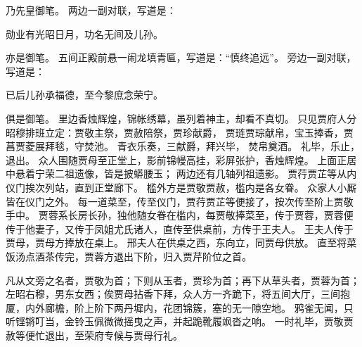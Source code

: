 乃先皇御笔。
两边一副对联，写道是：\par
\hop
勋业有光昭日月，功名无间及儿孙。
\par
\hop
亦是御笔。
五间正殿前悬一闹龙填青匾，写道是：“慎终追远”。
旁边一副对联，写道是：\par
\hop
已后儿孙承福德，至今黎庶念荣宁。
\par
\hop
俱是御笔。
里边香烛辉煌，锦帐绣幕，虽列着神主，却看不真切。
只见贾府人分昭穆排班立定：贾敬主祭，贾赦陪祭，贾珍献爵，
贾琏贾琮献帛，宝玉捧香，贾菖贾菱展拜毯，守焚池。
青衣乐奏，三献爵，拜兴毕，
焚帛奠酒。
礼毕，乐止，退出。
众人围随贾母至正堂上，影前锦幔高挂，彩屏张护，香烛辉煌。
上面正居中悬着宁荣二祖遗像，皆是披蟒腰玉；
两边还有几轴列祖遗影。
贾荇贾芷等从内仪门挨次列站，直到正堂廊下。
槛外方是贾敬贾赦，槛内是各女眷。
众家人小厮皆在仪门之外。
每一道菜至，传至仪门，贾荇贾芷等便接了，按次传至阶上贾敬手中。
贾蓉系长房长孙，独他随女眷在槛内，每贾敬捧菜至，传于贾蓉，贾蓉便传于他妻子，又传于凤姐尤氏诸人，直传至供桌前，方传于王夫人。
王夫人传于贾母，贾母方捧放在桌上。
邢夫人在供桌之西，东向立，同贾母供放。
直至将菜饭汤点酒茶传完，贾蓉方退出下阶，归入贾芹阶位之首。
\par
凡从文旁之名者，贾敬为首；下则从玉者，贾珍为首；再下从草头者，贾蓉为首；左昭右穆，男东女西；俟贾母拈香下拜，众人方一齐跪下，将五间大厅，三间抱厦，内外廊檐，阶上阶下两丹墀内，花团锦簇，塞的无一隙空地。
鸦雀无闻，只听铿锵叮当，金铃玉佩微微摇曳之声，并起跪靴履飒沓之响。
一时礼毕，贾敬贾赦等便忙退出，至荣府专候与贾母行礼。
\par
